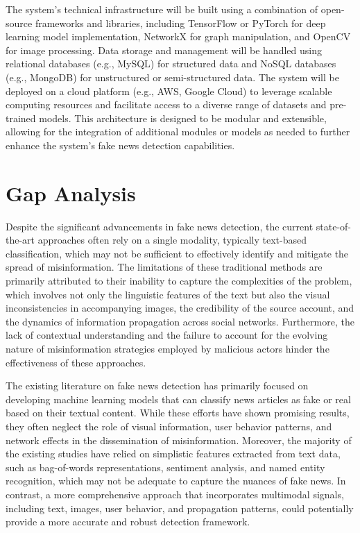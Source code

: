 \documentclass[conference]{IEEEtran}
\begin{document}
The system's technical infrastructure will be built using a combination of open-source frameworks and libraries, including TensorFlow or PyTorch for deep learning model implementation, NetworkX for graph manipulation, and OpenCV for image processing. Data storage and management will be handled using relational databases (e.g., MySQL) for structured data and NoSQL databases (e.g., MongoDB) for unstructured or semi-structured data. The system will be deployed on a cloud platform (e.g., AWS, Google Cloud) to leverage scalable computing resources and facilitate access to a diverse range of datasets and pre-trained models. This architecture is designed to be modular and extensible, allowing for the integration of additional modules or models as needed to further enhance the system's fake news detection capabilities.

\section{Gap Analysis}
Despite the significant advancements in fake news detection, the current state-of-the-art approaches often rely on a single modality, typically text-based classification, which may not be sufficient to effectively identify and mitigate the spread of misinformation. The limitations of these traditional methods are primarily attributed to their inability to capture the complexities of the problem, which involves not only the linguistic features of the text but also the visual inconsistencies in accompanying images, the credibility of the source account, and the dynamics of information propagation across social networks. Furthermore, the lack of contextual understanding and the failure to account for the evolving nature of misinformation strategies employed by malicious actors hinder the effectiveness of these approaches.

The existing literature on fake news detection has primarily focused on developing machine learning models that can classify news articles as fake or real based on their textual content. While these efforts have shown promising results, they often neglect the role of visual information, user behavior patterns, and network effects in the dissemination of misinformation. Moreover, the majority of the existing studies have relied on simplistic features extracted from text data, such as bag-of-words representations, sentiment analysis, and named entity recognition, which may not be adequate to capture the nuances of fake news. In contrast, a more comprehensive approach that incorporates multimodal signals, including text, images, user behavior, and propagation patterns, could potentially provide a more accurate and robust detection framework.
\end{document}

